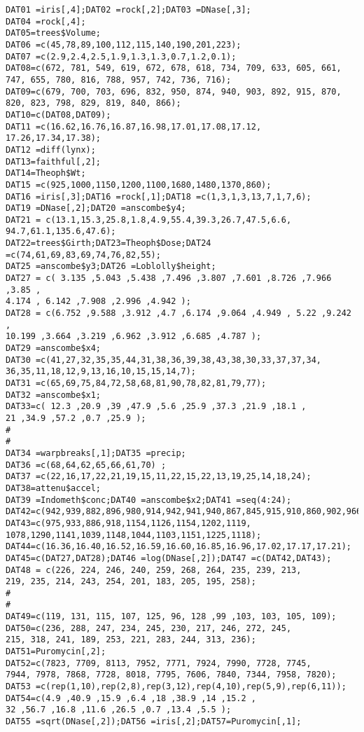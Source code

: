 \documentclass[]{article}
\begin{document}
\begin{verbatim}
DAT01 =iris[,4];DAT02 =rock[,2];DAT03 =DNase[,3];
DAT04 =rock[,4];
DAT05=trees$Volume;
DAT06 =c(45,78,89,100,112,115,140,190,201,223);
DAT07 =c(2.9,2.4,2.5,1.9,1.3,1.3,0.7,1.2,0.1);
DAT08=c(672, 781, 549, 619, 672, 678, 618, 734, 709, 633, 605, 661,
747, 655, 780, 816, 788, 957, 742, 736, 716);
DAT09=c(679, 700, 703, 696, 832, 950, 874, 940, 903, 892, 915, 870,
820, 823, 798, 829, 819, 840, 866);
DAT10=c(DAT08,DAT09);
DAT11 =c(16.62,16.76,16.87,16.98,17.01,17.08,17.12, 17.26,17.34,17.38);
DAT12 =diff(lynx);
DAT13=faithful[,2];
DAT14=Theoph$Wt;
DAT15 =c(925,1000,1150,1200,1100,1680,1480,1370,860);
DAT16 =iris[,3];DAT16 =rock[,1];DAT18 =c(1,3,1,3,13,7,1,7,6);
DAT19 =DNase[,2];DAT20 =anscombe$y4;
DAT21 = c(13.1,15.3,25.8,1.8,4.9,55.4,39.3,26.7,47.5,6.6,
94.7,61.1,135.6,47.6);
DAT22=trees$Girth;DAT23=Theoph$Dose;DAT24 =c(74,61,69,83,69,74,76,82,55);
DAT25 =anscombe$y3;DAT26 =Loblolly$height;
DAT27 = c( 3.135 ,5.043 ,5.438 ,7.496 ,3.807 ,7.601 ,8.726 ,7.966 ,3.85 ,
4.174 , 6.142 ,7.908 ,2.996 ,4.942 );
DAT28 = c(6.752 ,9.588 ,3.912 ,4.7 ,6.174 ,9.064 ,4.949 , 5.22 ,9.242 ,
10.199 ,3.664 ,3.219 ,6.962 ,3.912 ,6.685 ,4.787 );
DAT29 =anscombe$x4;
DAT30 =c(41,27,32,35,35,44,31,38,36,39,38,43,38,30,33,37,37,34,
36,35,11,18,12,9,13,16,10,15,15,14,7);
DAT31 =c(65,69,75,84,72,58,68,81,90,78,82,81,79,77);
DAT32 =anscombe$x1;
DAT33=c( 12.3 ,20.9 ,39 ,47.9 ,5.6 ,25.9 ,37.3 ,21.9 ,18.1 ,
21 ,34.9 ,57.2 ,0.7 ,25.9 );
#
#
DAT34 =warpbreaks[,1];DAT35 =precip;
DAT36 =c(68,64,62,65,66,61,70) ;
DAT37 =c(22,16,17,22,21,19,15,11,22,15,22,13,19,25,14,18,24);
DAT38=attenu$accel;
DAT39 =Indometh$conc;DAT40 =anscombe$x2;DAT41 =seq(4:24);
DAT42=c(942,939,882,896,980,914,942,941,940,867,845,915,910,860,902,966,851,963,834,962,945);
DAT43=c(975,933,886,918,1154,1126,1154,1202,1119, 1078,1290,1141,1039,1148,1044,1103,1151,1225,1118);
DAT44=c(16.36,16.40,16.52,16.59,16.60,16.85,16.96,17.02,17.17,17.21);
DAT45=c(DAT27,DAT28);DAT46 =log(DNase[,2]);DAT47 =c(DAT42,DAT43);
DAT48 = c(226, 224, 246, 240, 259, 268, 264, 235, 239, 213,
219, 235, 214, 243, 254, 201, 183, 205, 195, 258);
#
#
DAT49=c(119, 131, 115, 107, 125, 96, 128 ,99 ,103, 103, 105, 109);
DAT50=c(236, 288, 247, 234, 245, 230, 217, 246, 272, 245,
215, 318, 241, 189, 253, 221, 283, 244, 313, 236); DAT51=Puromycin[,2];
DAT52=c(7823, 7709, 8113, 7952, 7771, 7924, 7990, 7728, 7745,
7944, 7978, 7868, 7728, 8018, 7795, 7606, 7840, 7344, 7958, 7820);
DAT53 =c(rep(1,10),rep(2,8),rep(3,12),rep(4,10),rep(5,9),rep(6,11));
DAT54=c(4.9 ,40.9 ,15.9 ,6.4 ,18 ,38.9 ,14 ,15.2 ,
32 ,56.7 ,16.8 ,11.6 ,26.5 ,0.7 ,13.4 ,5.5 );
DAT55 =sqrt(DNase[,2]);DAT56 =iris[,2];DAT57=Puromycin[,1];

\end{verbatim}
\end{document}
